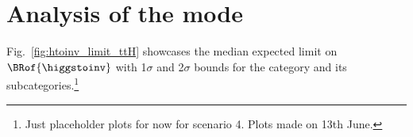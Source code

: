 



\section{Analysis of the \texorpdfstring{\ttH}{ttH} mode}
\label{sec:htoinv_analysis_ttH}


Fig.~\ref{fig:htoinv_limit_ttH} showcases the median expected limit on $\BRof{\higgstoinv}$ with 1$\sigma$ and 2$\sigma$ bounds for the \ttH category and its subcategories.\footnote{Just placeholder plots for now for scenario 4. Plots made on 13th June.}

